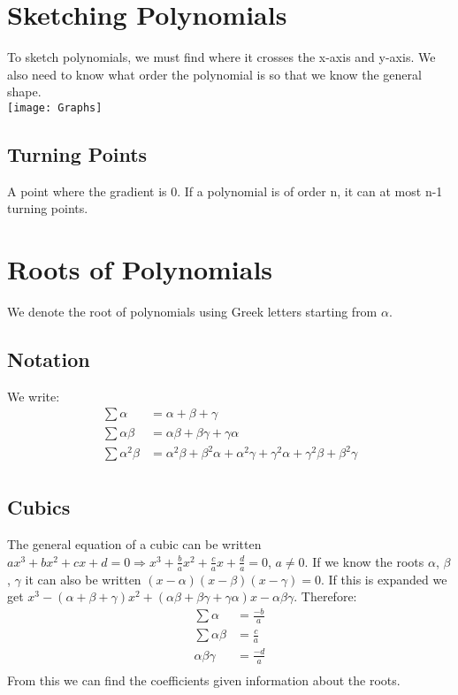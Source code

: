 \documentclass[class=article, crop=false]{standalone}
\begin{document}
\section*{Sketching Polynomials}
To sketch polynomials, we must find where it crosses the x-axis and y-axis. We also need to know what order the polynomial is so that we know the general shape.  \\
\texttt{[image: Graphs]}
\subsection*{Turning Points}
A point where the gradient is 0. If a polynomial is of order n, it can at most n-1 turning points. 

\section*{Roots of Polynomials}
We denote the root of polynomials using Greek letters starting from $\alpha$.
\subsection*{Notation}
We write:
\begin{align*}
\sum \alpha & = \alpha + \beta + \gamma \\
\sum \alpha \beta & = \alpha \beta + \beta \gamma + \gamma \alpha \\
\sum \alpha^2 \beta & = \alpha^2 \beta + \beta^2 \alpha + \alpha^2 \gamma + \gamma^2 \alpha + \gamma^2 \beta + \beta^2 \gamma \\
\end{align*}
\subsection*{Cubics}
The general equation of a cubic can be written $ax^3 + bx^2 + cx + d = 0 \Rightarrow x^3 + \frac{b}{a}x^2 + \frac{c}{a}x + \frac{d}{a} = 0$, $a \neq 0$. If we know the roots $\alpha$, $\beta$, $\gamma$ it can also be written $(x-\alpha)(x-\beta)(x-\gamma)=0$. If this is expanded we get  $x^3 - (\alpha + \beta + \gamma)x^2 + (\alpha \beta + \beta \gamma + \gamma \alpha)x - \alpha \beta \gamma$. Therefore:
\begin{align*}
\sum \alpha & = \frac{-b}{a} \\
\sum \alpha \beta & = \frac{c}{a} \\
\alpha \beta \gamma & = \frac{-d}{a} \\
\end{align*}
From this we can find the coefficients given information about the roots. 
\end{document}
